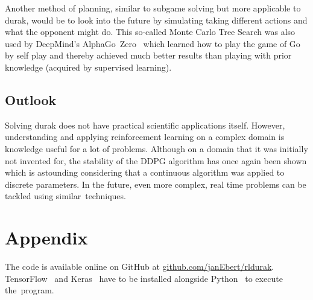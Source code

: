 \documentclass[a4paper,titlepage]{article}
\begin{document}
Another method of planning, similar to subgame solving but more applicable to durak, would be to look into the future by simulating taking different actions and what the opponent might do. This so-called Monte Carlo Tree Search was also used by DeepMind's AlphaGo~Zero~\cite{alphagozero} which learned how to play the game of Go by self play and thereby achieved much better results than playing with prior knowledge (acquired by supervised learning).

\subsection{Outlook}

Solving durak does not have practical scientific applications itself. However, understanding and applying reinforcement learning on a complex domain is knowledge useful for a lot of problems. Although on a domain that it was initially not invented for, the stability of the DDPG algorithm has once again been shown which is astounding considering that a continuous algorithm was applied to discrete parameters. In the future, even more complex, real time problems can be tackled using similar~techniques.

\newpage

\section{Appendix}
\label{sec:appendix}

The code is available online on GitHub at \url{github.com/janEbert/rldurak}. TensorFlow~\cite{tensorflow} and Keras~\cite{keras} have to be installed alongside Python~\cite{python} to execute the~program. \bigskip
\end{document}
